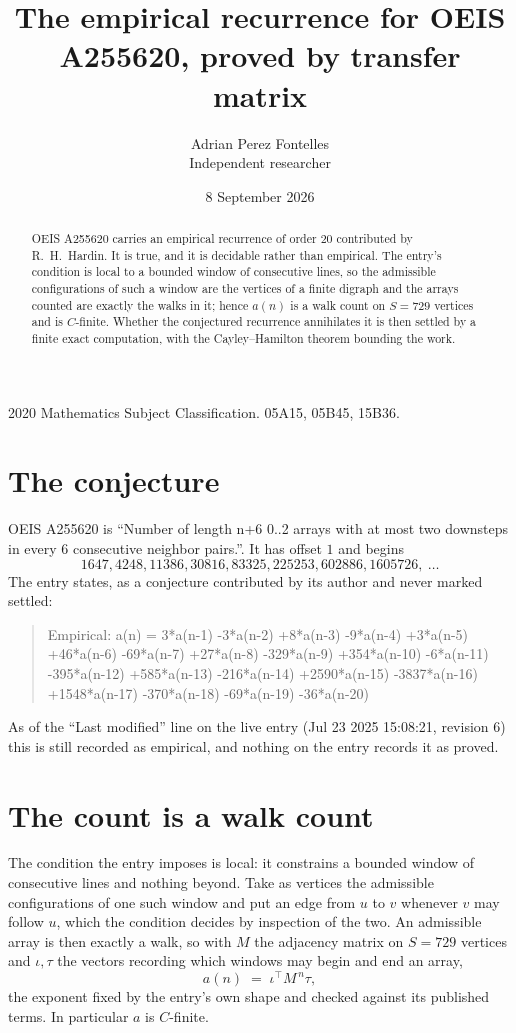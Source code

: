 \documentclass[11pt,a4paper]{article}
\title{The empirical recurrence for OEIS A255620, proved by transfer matrix}
\author{Adrian Perez Fontelles\\ \small Independent researcher}
\date{8 September 2026}
\theoremstyle{plain}
\theoremstyle{definition}
\begin{document}
\maketitle

\begin{abstract}
OEIS A255620 carries an empirical recurrence of order $20$ contributed by R.~H.~Hardin. It is
true, and it is decidable rather than empirical. The entry's condition is local to a bounded window of consecutive lines, so
the admissible configurations of such a window are the vertices of a finite digraph and the
arrays counted are exactly the walks in it; hence $a(n)$ is a walk count on $S=729$ vertices
and is $C$-finite. Whether the conjectured recurrence annihilates it is then settled by a
finite exact computation, with the Cayley--Hamilton theorem bounding the work.
\end{abstract}

\noindent\small 2020 Mathematics Subject Classification. 05A15, 05B45, 15B36.\normalsize

\section{The conjecture}

OEIS A255620 is ``Number of length n+6 0..2 arrays with at most two downsteps in every 6 consecutive neighbor pairs.''. It has offset $1$ and begins
\[
1647, 4248, 11386, 30816, 83325, 225253, 602886, 1605726,\ \dots
\]
The entry states, as a conjecture contributed by its author and never marked settled:
\begin{quote}
Empirical: a(n) = 3*a(n-1) -3*a(n-2) +8*a(n-3) -9*a(n-4) +3*a(n-5) +46*a(n-6) -69*a(n-7) +27*a(n-8) -329*a(n-9) +354*a(n-10) -6*a(n-11) -395*a(n-12) +585*a(n-13) -216*a(n-14) +2590*a(n-15) -3837*a(n-16) +1548*a(n-17) -370*a(n-18) -69*a(n-19) -36*a(n-20)
\end{quote}
As of the ``Last modified'' line on the live entry (Jul 23 2025 15:08:21, revision 6) this is still
recorded as empirical, and nothing on the entry records it as proved.

\section{The count is a walk count}

The condition the entry imposes is local: it constrains a bounded window of consecutive lines and nothing beyond. Take as
vertices the admissible configurations of one such window and put an edge from $u$ to $v$
whenever $v$ may follow $u$, which the condition decides by inspection of the two. An
admissible array is then exactly a walk, so with $M$ the adjacency matrix on $S=729$ vertices
and $\iota,\tau$ the vectors recording which windows may begin and end an array,
\[
a(n)\;=\;\iota^{\!\top}M^{\,n}\tau ,
\]
the exponent fixed by the entry's own shape and checked against its published terms. In
particular $a$ is $C$-finite.
\end{document}
